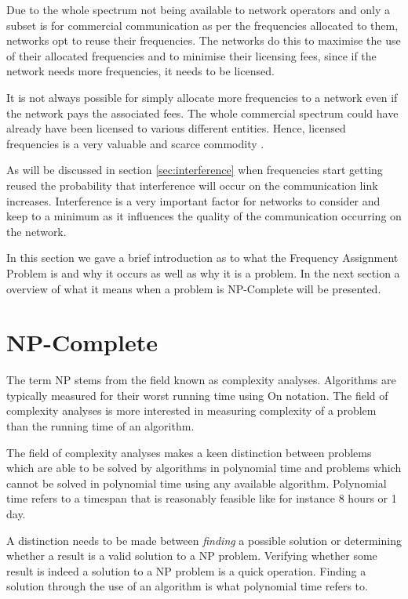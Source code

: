Due to the whole spectrum not being available to network operators and only a subset is for commercial communication as per the frequencies allocated to them, networks opt to reuse their frequencies\cite{FAPInCell}. The networks do this to maximise the use of their allocated frequencies and to minimise their licensing fees, since if the network needs more frequencies, it needs to be licensed\cite{FAPRAMColouring}.

It is not always possible for simply allocate more frequencies to a network even if the network pays the associated fees. The whole commercial spectrum could have already have been licensed to various different entities. Hence, licensed frequencies is a very valuable and scarce commodity \cite{FAPRAMColouring,FAPInCell,Eisenblatter,Karen2004}.

As will be discussed in section \ref{sec:interference} when frequencies start getting reused the probability that interference will occur on the communication link increases. Interference is a very important factor for networks to consider and keep to a minimum as it influences the quality of the communication occurring on the network.


In this section we gave a brief introduction as to what the Frequency Assignment Problem is and why it occurs as well as why it is a problem. In the next section a overview of what it means when a problem is NP-Complete will be presented.
\section{NP-Complete}
\label{sec:NPComplete}
The term NP stems from the field known as complexity analyses. Algorithms are typically measured for their worst running time using On notation. The field of complexity analyses is more interested in measuring complexity of a problem than the running time of an algorithm\cite{AIModernApproach}.

The field of complexity analyses makes a keen distinction between problems which are able to be solved by algorithms in polynomial time and problems which cannot be solved in polynomial time using any available algorithm\cite{AIModernApproach}. Polynomial time refers to a timespan that is reasonably feasible like for instance 8 hours or 1 day.

A distinction needs to be made between \emph{finding} a possible solution or determining whether a result is a valid solution to a NP problem. Verifying whether some result is indeed a solution to a NP problem is a quick operation. Finding a solution through the use of an algorithm is what polynomial time refers to.


